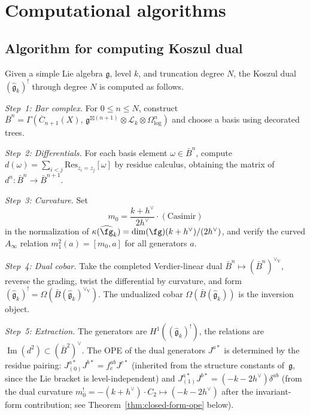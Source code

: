 \section{Computational algorithms}

\subsection{Algorithm for computing Koszul dual}

\begin{construction}\label{con:compute-km-dual}
Given a simple Lie algebra $\mathfrak{g}$, level $k$, and truncation degree $N$, the Koszul dual $(\widehat{\mathfrak{g}}_k)^!$ through degree $N$ is computed as follows.

\emph{Step~1: Bar complex.}
For $0 \le n \le N$, construct
$\bar{B}^n = \Gamma(\overline{C}_{n+1}(X),\, \mathfrak{g}^{\boxtimes(n+1)} \otimes \mathcal{L}_k \otimes \Omega^n_{\log})$
and choose a basis using decorated trees.

\emph{Step~2: Differentials.}
For each basis element $\omega \in \bar{B}^n$, compute $d(\omega) = \sum_{i<j} \mathrm{Res}_{z_i=z_j}[\omega]$ by residue calculus, obtaining the matrix of $d^n: \bar{B}^n \to \bar{B}^{n+1}$.

\emph{Step~3: Curvature.}
Set
\[
m_0 = \frac{k+h^\vee}{2h^\vee}\cdot(\text{Casimir})
\]
in the normalization of
\(\kappa(\widehat{\fg}_k)=\dim(\fg)(k+h^\vee)/(2h^\vee)\), and verify
the curved $A_\infty$ relation $m_1^2(a) = [m_0, a]$ for all
generators $a$.

\emph{Step~4: Dual cobar.}
Take the completed Verdier-linear dual
\(\bar{B}^n \mapsto (\bar{B}^n)^{\vee_{\mathrm V}}\), reverse the
grading, twist the differential by curvature, and form
$(\widehat{\mathfrak{g}}_k)^!
= \Omega(\bar{B}(\widehat{\mathfrak{g}}_k)^{\vee_{\mathrm V}})$.
The undualized cobar
\(\Omega(\bar{B}(\widehat{\mathfrak{g}}_k))\) is the inversion object.

\emph{Step~5: Extraction.}
The generators are $H^1((\widehat{\mathfrak{g}}_k)^!)$, the relations
are $\operatorname{Im}(d^2) \subset (\bar{B}^2)^\vee$. The OPE of
the dual generators $J^{a*}$ is determined by the residue pairing:
$J^{a*}_{(0)} J^{b*} = f^{ab}_c J^{c*}$ (inherited from the
structure constants of~$\mathfrak{g}$, since the Lie bracket is
level-independent) and $J^{a*}_{(1)} J^{b*} = (-k - 2h^\vee)
\delta^{ab}$ (from the dual curvature $m_0^! = -(k + h^\vee)
\cdot C_2 \mapsto (-k - 2h^\vee)$ after the invariant-form
contribution; see Theorem~\ref{thm:closed-form-ope} below).
\end{construction}

